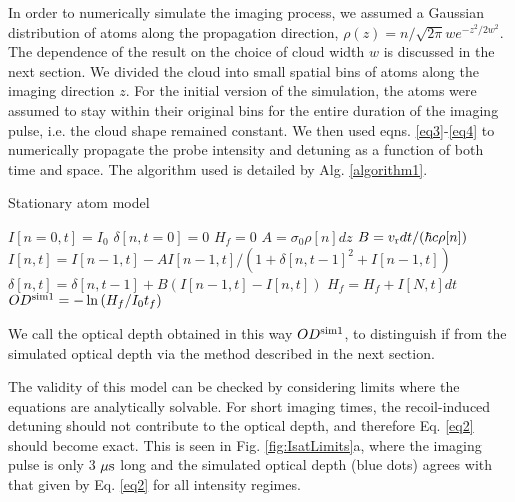 In order to numerically simulate the imaging process, we assumed a Gaussian distribution of atoms along the propagation direction, $\rho(z) = n/\sqrt{2\pi}w e^{-z^2/2w^2}$. The dependence of the result on the choice of cloud  width $w$ is discussed in the next section. We divided the cloud into small spatial bins of atoms along the imaging direction $z$. For the initial version of the simulation, the atoms were assumed to stay within their original bins for the entire duration of the imaging pulse, i.e. the cloud shape remained constant. We then used eqns. \ref{eq3}-\ref{eq4} to numerically propagate the probe intensity and detuning as a function of both time and space. The algorithm used is detailed by Alg. \ref{algorithm1}.
%

\begin{algorithm}
\caption{Stationary atom model}
\label{algorithm1}
\begin{algorithmic}
\STATE $I[n=0,t]=I_0$ 
\STATE $\delta[n, t=0]=0$ 
\STATE $H_f=0$ 
 \STATE $A=\sigma_0\rho[n] dz$ 
 \STATE $B=v_{\rm{r}} dt/(\hbar c \rho[n])$  
\STATE $I[n,t]=I[n-1,t] - A I[n-1,t]/(1+\delta[n,t-1]^2+I[n-1,t])$  
\STATE $\delta[n,t]=\delta[n,t-1]+B\left(I[n-1,t]-I[n,t]\right)$  
\ENDFOR
\STATE $H_f =H_f+ I[N,t]dt$ 
\ENDFOR
\STATE $OD^{\rm{sim1}}=-\ln{(H_f/I_0t_f)}$
\end{algorithmic}
\end{algorithm}

We call the optical depth obtained in this way $OD^{\rm{sim1}}$, to distinguish if from the simulated optical depth via the method described in the next section. 

The validity of this model can be checked by considering limits where the equations are analytically solvable. For short imaging times, the recoil-induced detuning should not contribute to the optical depth, and therefore Eq. \ref{eq2} should become exact. This is seen in Fig. \ref{fig:IsatLimits}a, where the imaging pulse is only 3 $\mu \rm{s}$ long and the simulated optical depth (blue dots) agrees with that given by Eq. \ref{eq2} for all intensity regimes.  

